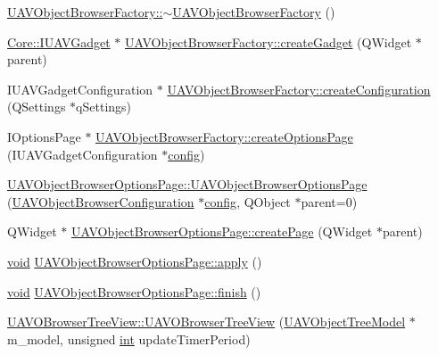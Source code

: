 \begin{DoxyCompactItemize}
\item 
\hyperlink{group___u_a_v_object_browser_plugin_ga54b418760329382fb643d6426b98f364}{U\-A\-V\-Object\-Browser\-Factory\-::$\sim$\-U\-A\-V\-Object\-Browser\-Factory} ()
\item 
\hyperlink{class_core_1_1_i_u_a_v_gadget}{Core\-::\-I\-U\-A\-V\-Gadget} $\ast$ \hyperlink{group___u_a_v_object_browser_plugin_gaed204f2a2b245f42bb13ed08a9ea5e24}{U\-A\-V\-Object\-Browser\-Factory\-::create\-Gadget} (Q\-Widget $\ast$parent)
\item 
I\-U\-A\-V\-Gadget\-Configuration $\ast$ \hyperlink{group___u_a_v_object_browser_plugin_gadb16c3cd6a17fd14fe487542e0905a47}{U\-A\-V\-Object\-Browser\-Factory\-::create\-Configuration} (Q\-Settings $\ast$q\-Settings)
\item 
I\-Options\-Page $\ast$ \hyperlink{group___u_a_v_object_browser_plugin_ga196f1eda8a78dac2c94fb6fe3f6a563d}{U\-A\-V\-Object\-Browser\-Factory\-::create\-Options\-Page} (I\-U\-A\-V\-Gadget\-Configuration $\ast$\hyperlink{deflate_8c_a4473b5227787415097004fd39f55185e}{config})
\item 
\hyperlink{group___u_a_v_object_browser_plugin_gae101cd8e551d717a5421361feafa1cf0}{U\-A\-V\-Object\-Browser\-Options\-Page\-::\-U\-A\-V\-Object\-Browser\-Options\-Page} (\hyperlink{class_u_a_v_object_browser_configuration}{U\-A\-V\-Object\-Browser\-Configuration} $\ast$\hyperlink{deflate_8c_a4473b5227787415097004fd39f55185e}{config}, Q\-Object $\ast$parent=0)
\item 
Q\-Widget $\ast$ \hyperlink{group___u_a_v_object_browser_plugin_gae567a8d4a9212e69b15f4cdb06c7ac09}{U\-A\-V\-Object\-Browser\-Options\-Page\-::create\-Page} (Q\-Widget $\ast$parent)
\item 
\hyperlink{group___u_a_v_objects_plugin_ga444cf2ff3f0ecbe028adce838d373f5c}{void} \hyperlink{group___u_a_v_object_browser_plugin_ga13631605b54e41a066fa4f4d2472b072}{U\-A\-V\-Object\-Browser\-Options\-Page\-::apply} ()
\item 
\hyperlink{group___u_a_v_objects_plugin_ga444cf2ff3f0ecbe028adce838d373f5c}{void} \hyperlink{group___u_a_v_object_browser_plugin_gabd2876750567bb091c8c009d2cca931f}{U\-A\-V\-Object\-Browser\-Options\-Page\-::finish} ()
\item 
\hyperlink{group___u_a_v_object_browser_plugin_gac8e16cfc29870fb1f96574c5e0a99f13}{U\-A\-V\-O\-Browser\-Tree\-View\-::\-U\-A\-V\-O\-Browser\-Tree\-View} (\hyperlink{class_u_a_v_object_tree_model}{U\-A\-V\-Object\-Tree\-Model} $\ast$m\-\_\-model, unsigned \hyperlink{ioapi_8h_a787fa3cf048117ba7123753c1e74fcd6}{int} update\-Timer\-Period)

\end{DoxyCompactItemize}
